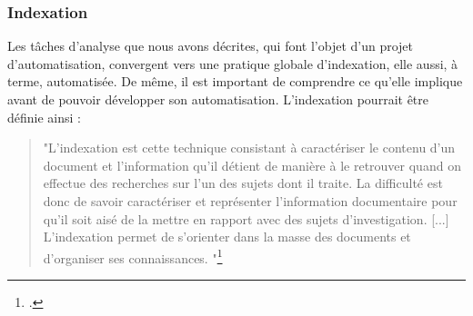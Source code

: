 \subsubsection{Indexation}
Les tâches d'analyse que nous avons décrites, qui font l'objet d'un projet d'automatisation, convergent vers une pratique globale d'indexation, elle aussi, à terme, automatisée. De même, il est important de comprendre ce qu'elle implique avant de pouvoir développer son automatisation. L'indexation pourrait être définie ainsi :  

\begin{quote}
	"L'indexation est cette technique consistant à caractériser le contenu d'un document et l'information qu'il détient de manière à le retrouver quand on effectue des recherches sur l'un des sujets dont il traite. La difficulté est donc de savoir caractériser et représenter l'information documentaire pour qu'il soit aisé de la mettre en rapport avec des sujets d'investigation. [...] L'indexation permet de s'orienter dans la masse des documents et d'organiser ses connaissances. "\footcite{zotero-item-582}
\end{quote}


